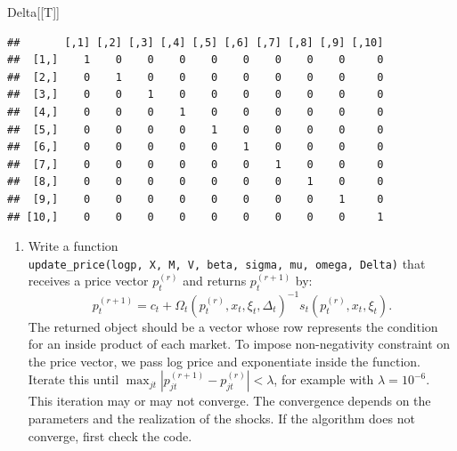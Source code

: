 \documentclass[
]{book}
\newenvironment{Shaded}{\begin{snugshade}}{\end{snugshade}}
\newcommand{\NormalTok}[1]{#1}
\providecommand{\tightlist}{%
  \setlength{\itemsep}{0pt}\setlength{\parskip}{0pt}}
\begin{document}
\begin{Shaded}
\begin{Highlighting}[]
\NormalTok{Delta[[T]]}
\end{Highlighting}
\end{Shaded}

\begin{verbatim}
##       [,1] [,2] [,3] [,4] [,5] [,6] [,7] [,8] [,9] [,10]
##  [1,]    1    0    0    0    0    0    0    0    0     0
##  [2,]    0    1    0    0    0    0    0    0    0     0
##  [3,]    0    0    1    0    0    0    0    0    0     0
##  [4,]    0    0    0    1    0    0    0    0    0     0
##  [5,]    0    0    0    0    1    0    0    0    0     0
##  [6,]    0    0    0    0    0    1    0    0    0     0
##  [7,]    0    0    0    0    0    0    1    0    0     0
##  [8,]    0    0    0    0    0    0    0    1    0     0
##  [9,]    0    0    0    0    0    0    0    0    1     0
## [10,]    0    0    0    0    0    0    0    0    0     1
\end{verbatim}

\begin{enumerate}
\def\labelenumi{\arabic{enumi}.}
\setcounter{enumi}{6}
\tightlist
\item
  Write a function \texttt{update\_price(logp,\ X,\ M,\ V,\ beta,\ sigma,\ mu,\ omega,\ Delta)} that receives a price vector \(p_t^{(r)}\) and returns \(p_t^{(r + 1)}\) by:
  \[
  p_t^{(r + 1)} = c_t + \Omega_t(p_t^{(r)}, x_t, \xi_t, \Delta_t)^{-1} s_t(p_t^{(r)}, x_t, \xi_t).
  \]
  The returned object should be a vector whose row represents the condition for an inside product of each market. To impose non-negativity constraint on the price vector, we pass log price and exponentiate inside the function. Iterate this until \(\max_{jt}|p_{jt}^{(r + 1)} - p_{jt}^{(r)}| < \lambda\), for example with \(\lambda = 10^{-6}\). This iteration may or may not converge. The convergence depends on the parameters and the realization of the shocks. If the algorithm does not converge, first check the code.
\end{enumerate}
\end{document}
